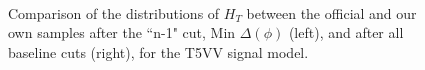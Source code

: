 \begin{figure}
        \centering
        \hspace{-1 cm}
        ~ %
        \caption{Comparison of the distributions of $H_T$ between the official and our own samples after the ``n-1" cut, Min $\Delta(\phi)$ (left), and after all baseline cuts (right), for the T5VV signal model.}\label{fig:animals}
\end{figure}        
        
